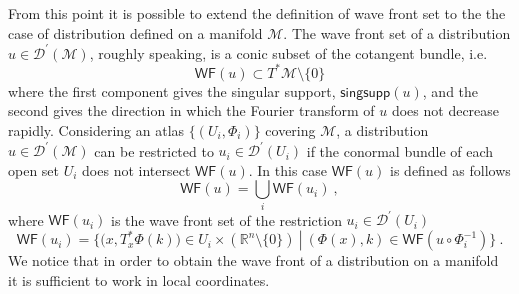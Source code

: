 \documentclass[11pt]{book}
\newcommand{\singsupp}{\mathsf{singsupp}}
\newcommand{\WF}{\mathsf{WF}}
\newcommand{\Dcal}{\mathcal{D}}
\newcommand{\Mcal}{\mathcal{M}}
\newcommand{\Rbb}{\mathbb{R}}
\theoremstyle{break}
\begin{document}
From this point it is possible to extend the definition of wave front set to the the case of distribution defined on a manifold $\Mcal$. The wave front set of a distribution $u \in \Dcal^\prime(\Mcal)$, roughly speaking, is a conic subset of the cotangent bundle, i.e.
%
\begin{equation}
\WF(u) \subset T^\ast\Mcal\setminus\{0\} 
\end{equation}
%
where the first component gives the singular support, $\singsupp(u)$, and the second gives the direction in which the Fourier transform of $u$ does not decrease rapidly. Considering an atlas $\{(U_i,\Phi_i)\}$ covering $\Mcal$, a distribution $u\in \Dcal^\prime(\Mcal)$ can be restricted to $u_i \in \Dcal^\prime(U_i)$ if the conormal bundle of each open set $U_i$ does not intersect $\WF(u)$. In this case $\WF(u)$ is defined as follows
%
\begin{equation*}
\WF(u) = \bigcup_i \WF(u_i) \ ,
\end{equation*}
%
where $\WF(u_i)$ is the wave front set of the restriction $u_i \in \Dcal^\prime(U_i)$
%
\begin{equation*}
\WF(u_i) = \bigg\{ \bigg( x, T_x^\ast\Phi(k) \bigg) \in U_i \times \left( \Rbb^n \setminus \{0\} \right) \ \left| \ \left( \Phi(x) , k \right) \in \WF\left( u \circ \Phi_i^{-1} \right) \bigg\} \ . \right.
\end{equation*}
%
We notice that in order to obtain the wave front of a distribution on a manifold it is sufficient to work in local coordinates.


\bigskip
\end{document}
